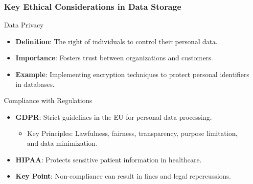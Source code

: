 \documentclass[aspectratio=169]{beamer}
\begin{document}
\begin{frame}[fragile]
    \frametitle{Key Ethical Considerations in Data Storage}
    \begin{block}{Data Privacy}
        \begin{itemize}
            \item \textbf{Definition}: The right of individuals to control their personal data.
            \item \textbf{Importance}: Fosters trust between organizations and customers.
            \item \textbf{Example}: Implementing encryption techniques to protect personal identifiers in databases.
        \end{itemize}
    \end{block}
    
    \begin{block}{Compliance with Regulations}
        \begin{itemize}
            \item \textbf{GDPR}: Strict guidelines in the EU for personal data processing.
                \begin{itemize}
                    \item Key Principles: Lawfulness, fairness, transparency, purpose limitation, and data minimization.
                \end{itemize}
            \item \textbf{HIPAA}: Protects sensitive patient information in healthcare.
            \item \textbf{Key Point}: Non-compliance can result in fines and legal repercussions.
        \end{itemize}
    \end{block}
\end{frame}
\end{document}

